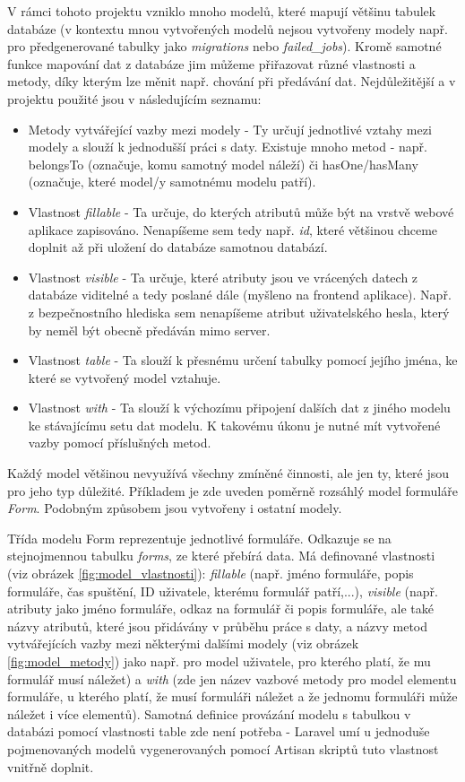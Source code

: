 	V rámci tohoto projektu vzniklo mnoho modelů, které mapují většinu tabulek databáze (v kontextu mnou vytvořených modelů nejsou vytvořeny modely např. pro předgenerované tabulky jako \textit{migrations} nebo \textit{failed\_jobs}). Kromě samotné funkce mapování dat z databáze jim můžeme přiřazovat různé vlastnosti a metody, díky kterým lze měnit např. chování při předávání dat. Nejdůležitější a v projektu použité jsou v následujícím seznamu:
	
	\begin{itemize}
		\item Metody vytvářející vazby mezi modely - Ty určují jednotlivé vztahy mezi modely a slouží k jednodušší práci s daty. Existuje mnoho metod - např. belongsTo (označuje, komu samotný model náleží) či hasOne/hasMany (označuje, které model/y samotnému modelu patří). \cite{LaravelORM}
		\item Vlastnost \textit{fillable} - Ta určuje, do kterých atributů může být na vrstvě webové aplikace zapisováno. Nenapíšeme sem tedy např. \textit{id}, které většinou chceme doplnit až při uložení do databáze samotnou databází. \cite{LaravelORM}
		\item Vlastnost \textit{visible} - Ta určuje, které atributy jsou ve vrácených datech z databáze viditelné a tedy poslané dále (myšleno na frontend aplikace). Např. z bezpečnostního hlediska sem nenapíšeme atribut uživatelského hesla, který by neměl být obecně předáván mimo server. \cite{LaravelORM}
		\item Vlastnost \textit{table} - Ta slouží k přesnému určení tabulky pomocí jejího jména, ke které se vytvořený model vztahuje. \cite{LaravelORM}
		\item Vlastnost \textit{with} - Ta slouží k výchozímu připojení dalších dat z jiného modelu ke stávajícímu setu dat modelu. K takovému úkonu je nutné mít vytvořené vazby pomocí příslušných metod. \cite{LaravelORM}
	\end{itemize}

	Každý model většinou nevyužívá všechny zmíněné činnosti, ale jen ty, které jsou pro jeho typ důležité. Příkladem je zde uveden poměrně rozsáhlý model formuláře \textit{Form}. Podobným způsobem jsou vytvořeny i ostatní modely.
	
	Třída modelu Form reprezentuje jednotlivé formuláře. Odkazuje se na stejnojmennou tabulku \textit{forms}, ze které přebírá data. Má definované vlastnosti (viz obrázek \ref{fig:model_vlastnosti}): \textit{fillable} (např. jméno formuláře, popis formuláře, čas spuštění, ID uživatele, kterému formulář patří,...), \textit{visible} (např. atributy jako jméno formuláře, odkaz na formulář či popis formuláře, ale také názvy atributů, které jsou přidávány v průběhu práce s daty, a názvy metod vytvářejících vazby mezi některými dalšími modely (viz obrázek \ref{fig:model_metody}) jako např. pro model uživatele, pro kterého platí, že mu formulář musí náležet) a \textit{with} (zde jen název vazbové metody pro model elementu formuláře, u kterého platí, že musí formuláři náležet a že jednomu formuláři může náležet i více elementů). Samotná definice provázání modelu s tabulkou v databázi pomocí vlastnosti table zde není potřeba - Laravel umí u jednoduše pojmenovaných modelů vygenerovaných pomocí Artisan skriptů tuto vlastnost vnitřně doplnit.
	
